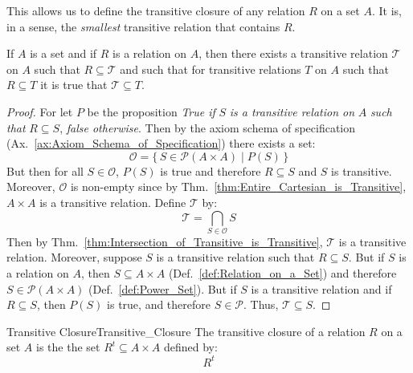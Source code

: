     This allows us to define the transitive closure of any relation $R$ on a set
    $A$. It is, in a sense, the \textit{smallest} transitive relation that
    contains $R$.
    \begin{theorem}
        If $A$ is a set and if $R$ is a relation on $A$, then there exists a
        transitive relation $\mathcal{T}$ on $A$ such that
        $R\subseteq\mathcal{T}$ and such that for transitive relations $T$ on
        $A$ such that $R\subseteq{T}$ it is true that $\mathcal{T}\subseteq{T}$.
    \end{theorem}
    \begin{proof}
        For let $P$ be the proposition \textit{True if} $S$
        \textit{is a transitive relation on} $A$ \textit{such that}
        $R\subseteq{S}$, \textit{false otherwise}. Then by the axiom schema of
        specification (Ax.~\ref{ax:Axiom_Schema_of_Specification}) there exists
        a set:
        \begin{equation}
            \mathcal{O}=\big\{\,S\in\mathcal{P}(A\times{A})\;|\;P(S)\,\big\}
        \end{equation}
        But then for all $S\in\mathcal{O}$, $P(S)$ is true and therefore
        $R\subseteq{S}$ and $S$ is transitive. Moreover, $\mathcal{O}$ is
        non-empty since by Thm.~\ref{thm:Entire_Cartesian_is_Transitive},
        $A\times{A}$ is a transitive relation. Define $\mathcal{T}$ by:
        \begin{equation}
            \mathcal{T}=\bigcap_{S\in\mathcal{O}}S
        \end{equation}
        Then by Thm.~\ref{thm:Intersection_of_Transitive_is_Transitive},
        $\mathcal{T}$ is a transitive relation. Moreover, suppose $S$ is a
        transitive relation such that $R\subseteq{S}$. But if $S$ is a relation
        on $A$, then $S\subseteq{A}\times{A}$
        (Def.~\ref{def:Relation_on_a_Set}) and therefore
        $S\in\mathcal{P}(A\times{A})$ (Def.~\ref{def:Power_Set}). But if $S$ is
        a transitive relation and if $R\subseteq{S}$, then $P(S)$ is true, and
        therefore $S\in\mathcal{P}$. Thus, $\mathcal{T}\subseteq{S}$.
    \end{proof}
    \begin{fdefinition}{Transitive Closure}{Transitive_Closure}
        The transitive closure of a relation $R$ on a set
        $A$ is the the set $R^{t}\subseteq{A}\times{A}$ defined by:
        \begin{equation}
            R^{t}
        \end{equation}
    \end{fdefinition}
